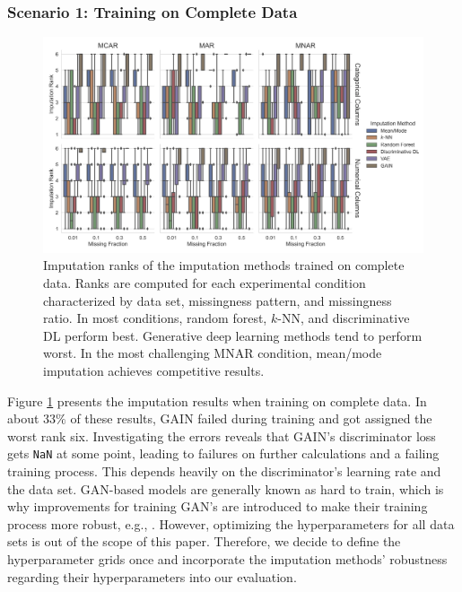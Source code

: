 \documentclass[utf8]{frontiersSCNS} %
\newcommand{\code}[1]{\texttt{#1}}
\begin{document}
\subsubsection{Scenario 1: Training on Complete Data}
\label{sec:results_experiment1_scenario1}

\begin{figure}\centering
	\includegraphics[width=1\columnwidth]{fully_observed_impute_rank_boxplot}
	\caption{Imputation ranks of the  imputation methods trained on complete data. Ranks are computed for each experimental condition characterized by data set, missingness pattern, and missingness ratio. In most conditions, random forest, $k$-NN, and discriminative DL perform best. Generative deep learning methods tend to perform worst. In the most challenging MNAR condition, mean/mode imputation achieves competitive results.
	}
	\label{fig:fully_observed_impute_rank_boxplot}
\end{figure}


Figure \ref{fig:fully_observed_impute_rank_boxplot} presents the imputation results when training on complete data. In about $33\%$ of these results, GAIN failed during training and got assigned the worst rank six. Investigating the errors reveals that GAIN's discriminator loss gets \code{NaN} at some point, leading to failures on further calculations and a failing training process. This depends heavily on the discriminator's learning rate and the data set. GAN-based models are generally known as hard to train, which is why improvements for training GAN's are introduced to make their training process more robust, e.g., \cite{GAN_balance_1, GAN_balance_2, GAN_balance_3}. However, optimizing the hyperparameters for all data sets is out of the scope of this paper. Therefore, we decide to define the hyperparameter grids once and incorporate the imputation methods' robustness regarding their hyperparameters into our evaluation.
\end{document}
